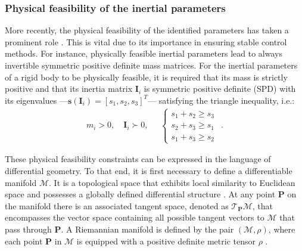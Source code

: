 \subsubsection{Physical feasibility of the inertial parameters}\label{sec:spd_manifold}
More recently, the physical feasibility of the identified parameters has taken a prominent role \cite{Wensing2017Linearmatrixinequalities,Ayusawa2010Identificationstandardinertial,Traversaro2016Identificationfullyphysical,Sousa2014Physicalfeasibilityrobot}. This is vital due to its importance in ensuring stable control methods. For instance, physically feasible inertial parameters lead to always invertible symmetric positive definite mass matrices. For the inertial parameters of a rigid body to be physically feasible, it is required that its mass is
strictly positive and that its inertia matrix $ \bm{I}_i $ is symmetric positive definite (SPD)  with its eigenvalues ---$\bm{s}\left(\bm{I}_i\right) = [s_1,s_2,s_3]^T$--- satisfying the triangle inequality, i.e.:\\
\begin{equation}\label{eq:feasibility_constraints}
	m_i>0, 
	\quad
	\bm{I}_i \succ 0,
	\quad
	\begin{aligned}
		\begin{cases}
			s_1 + s_2 \geq s_3\\
			s_2 + s_3 \geq s_1\\
			s_1 + s_3 \geq s_2
		\end{cases}
	\end{aligned} .
\end{equation}

These physical feasibility constraints can be expressed in the language of differential geometry. To that end, it is first necessary to define a differentiable manifold $\mathcal{M}$. It is a topological space that exhibits local similarity to Euclidean space and possesses a globally defined differential structure \cite{Jayasumana2013KernelmethodsRiemannian}. At any point $\bm{P}$ on the manifold there is an associated tangent space, denoted as $\mathcal{T}_{\bm{P}}\mathcal{M}$, that encompasses the vector space containing all possible tangent vectors to $\mathcal{M}$ that pass through $\bm{P}$. A Riemannian manifold is defined by the pair $(\mathcal{M},\rho)$, where each point $\bm{P}$ in $\mathcal{M}$ is equipped with a positive definite metric tensor $\rho$ \cite{Pennec2006Riemannianframeworktensor}.

